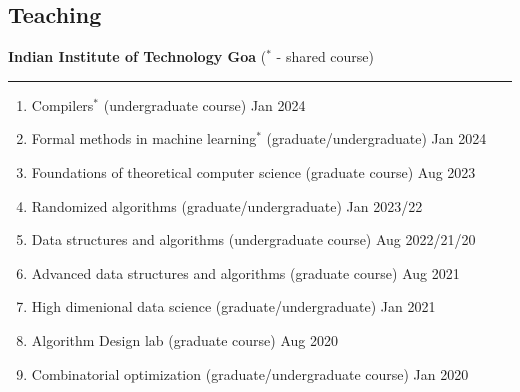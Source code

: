 \documentclass[margin]{res}
\begin{document}
\begin{resume}
\section{Teaching}
					{\bf Indian Institute of Technology Goa } ($^*$ - shared course) \\
					\noindent\rule{13cm}{0.4pt}
					\begin{enumerate}
					\item {Compilers$^*$} (undergraduate course) \hfill Jan 2024
					\item {Formal methods in machine learning$^*$} (graduate/undergraduate) \hfill Jan 2024
					\item {Foundations of theoretical computer science}  (graduate course) \hfill Aug 2023
					\item Randomized algorithms (graduate/undergraduate) \hfill Jan 2023/22
					\item {Data structures and algorithms} (undergraduate course)  \hfill  Aug 2022/21/20
					\item {Advanced data structures and algorithms}  (graduate course)  \hfill Aug 2021
					\item {High dimenional data science} (graduate/undergraduate) \hfill Jan 2021
					\item {Algorithm Design lab} (graduate course) \hfill  Aug 2020
					\item {Combinatorial optimization} (graduate/undergraduate course) \hfill  Jan 2020

\end{enumerate}
\end{resume}
\end{document}
